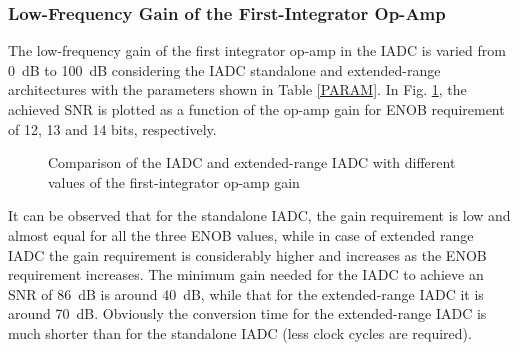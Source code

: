 \subsubsection{Low-Frequency Gain of the First-Integrator Op-Amp}
The low-frequency gain of the first integrator op-amp in the IADC is varied from 0~dB to 100~dB considering the IADC standalone and extended-range architectures with the parameters shown in Table \ref{PARAM}. In Fig. \ref{SNR_G1}, the achieved SNR is plotted as a function of the op-amp gain for ENOB requirement of 12, 13 and 14 bits, respectively.
\begin{figure}
\centering
{}
\hfil
{}
\caption{Comparison of the IADC and extended-range IADC with different values of the first-integrator op-amp gain}
\label{SNR_G1}
\end{figure}
It can be observed that for the standalone IADC, the gain requirement is low and almost equal for all the three ENOB values, while in case of extended range IADC the gain requirement is considerably higher and increases as the ENOB requirement increases. The minimum gain needed for the IADC to achieve an SNR of 86~dB is around 40~dB, while that for the extended-range IADC it is around 70~dB. Obviously the conversion time for the extended-range IADC is much shorter than for the standalone IADC (less clock cycles are required).

